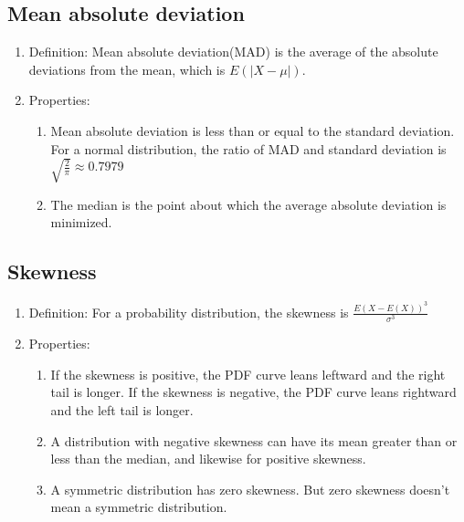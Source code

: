 \documentclass[a4paper]{article}
\begin{document}
\subsection{Mean absolute deviation}
	\begin{enumerate}
	\item Definition: Mean absolute deviation(MAD) is the average of the absolute deviations from the mean, which is $E(|X-\mu|)$.
	\item Properties:
		\begin{enumerate}
		\item Mean absolute deviation is less than or equal to the standard deviation. For a normal distribution, the ratio of MAD and standard deviation is $\sqrt{\frac{2}{\pi}}\approx 0.7979$
		\item The median is the point about which the average absolute deviation is minimized.
		\end{enumerate}
	\end{enumerate}

\subsection{Skewness}
	\begin{enumerate}
	\item Definition: For a probability distribution, the skewness is $\frac{E(X-E(X))^3}{\sigma^3}$
	\item Properties:
		\begin{enumerate}
		\item If the skewness is positive, the PDF curve leans leftward and the right tail is longer. If the skewness is negative, the PDF curve leans rightward and the left tail is longer.
		\item A distribution with negative skewness can have its mean greater than or less than the median, and likewise for positive skewness.
		\item A symmetric distribution has zero skewness. But zero skewness doesn't mean a symmetric distribution.
		\end{enumerate}
	\end{enumerate}
\end{document}
